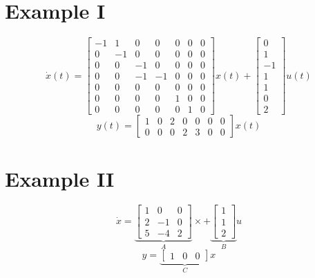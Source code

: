 \documentclass[10pt,a4paper,oneside]{article}
\begin{document}
\section{Example I}
\[
\dot{x}(t)=\left[\begin{array}{ccccccc}{-1} & {1} & {0} & {0} & {0} & {0} & {0} \\ {0} & {-1} & {0} & {0} & {0} & {0} & {0} \\ {0} & {0} & {-1} & {0} & {0} & {0} & {0} \\ {0} & {0} & {-1} & {-1} & {0} & {0} & {0} \\ {0} & {0} & {0} & {0} & {0} & {0} & {0} \\ {0} & {0} & {0} & {0} & {1} & {0} & {0} \\ {0} & {0} & {0} & {0} & {0} & {1} & {0}\end{array}\right] x(t)+\left[\begin{array}{c}{0} \\ {1} \\ {-1} \\ {1} \\ {1} \\ {0} \\ {2}\end{array}\right] u(t)
\]
\[
y(t)=\left[\begin{array}{lllllll}{1} & {0} & {2} & {0} & {0} & {0} & {0} \\ {0} & {0} & {0} & {2} & {3} & {0} & {0}\end{array}\right] x(t)
\]
\section{Example II}
\[
\dot{x}=\underbrace{\left[\begin{array}{ccc}{1} & {0} & {0} \\ {2} & {-1} & {0} \\ {5} & {-4} & {2}\end{array}\right]}_{A} \times+\underbrace{\left[\begin{array}{l}{1} \\ {1} \\ {2}\end{array}\right]}_{B} u
\]
\[
y=\underbrace{\left[\begin{array}{lll}{1} & {0} & {0}\end{array}\right]}_{C} x
\]
\end{document}
